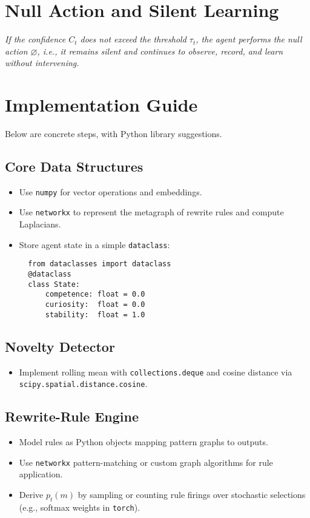 \documentclass[11pt]{article}
\begin{document}
\section{Null Action and Silent Learning}
\textit{If the confidence $C_t$ does not exceed the threshold $\tau_t$, the agent performs the null action $\varnothing$, i.e., it remains silent and continues to observe, record, and learn without intervening.}

\section{Implementation Guide}

Below are concrete steps, with Python library suggestions.

\subsection{Core Data Structures}
\begin{itemize}
  \item Use \texttt{numpy} for vector operations and embeddings.
  \item Use \texttt{networkx} to represent the metagraph of rewrite rules and compute Laplacians.
  \item Store agent state in a simple \texttt{dataclass}:
  \begin{verbatim}
  from dataclasses import dataclass
  @dataclass
  class State:
      competence: float = 0.0
      curiosity:  float = 0.0
      stability:  float = 1.0
  \end{verbatim}
\end{itemize}

\subsection{Novelty Detector}
\begin{itemize}
  \item Implement rolling mean with \texttt{collections.deque} and cosine distance via \texttt{scipy.spatial.distance.cosine}.
\end{itemize}

\subsection{Rewrite-Rule Engine}
\begin{itemize}
  \item Model rules as Python objects mapping pattern graphs to outputs.
  \item Use \texttt{networkx} pattern-matching or custom graph algorithms for rule application.
  \item Derive $p_t(m)$ by sampling or counting rule firings over stochastic selections (e.g., softmax weights in \texttt{torch}).
\end{itemize}
\end{document}
